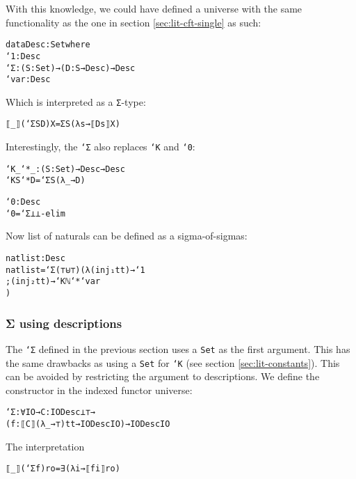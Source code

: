 With this knowledge, we could have defined a universe with the same
functionality as the one in section \ref{sec:lit-cft-single} as such:

\begin{alltt}
data Desc : Set where
  `1 : Desc
  `Σ : (S : Set) → (D : S → Desc) → Desc
  `var : Desc
\end{alltt}

Which is interpreted as a \texttt{Σ}-type:

\begin{alltt}
⟦_⟧ (`Σ S D) X = Σ S (λ s → ⟦ D s ⟧ X)
\end{alltt}

Interestingly, the \texttt{`Σ} also replaces \texttt{`K} and
\texttt{`0}:

\begin{alltt}
`K_`*_ : (S : Set) → Desc → Desc
`K S `* D = `Σ S (λ _ → D)

`0 : Desc
`0 = `Σ ⊥ ⊥-elim
\end{alltt}

\begin{example}
Now list of naturals can be defined as a sigma-of-sigmas:

\begin{alltt}
natlist : Desc
natlist = `Σ (⊤ ⊎ ⊤) (λ { (inj₁ tt) → `1
                        ; (inj₂ tt) → `K ℕ `* `var
                        })
\end{alltt}
\end{example}

\subsubsection{Σ using descriptions}

The \texttt{`Σ} defined in the previous section uses a \texttt{Set} as
the first argument.
This has the same drawbacks as using a \texttt{Set} for
\texttt{`K} (see section \ref{sec:lit-constants}).
This can be avoided by restricting the argument to descriptions.
We define the constructor in the indexed functor universe:

\begin{alltt}
`Σ : ∀{I O} → {C : IODesc ⊥ ⊤} →
     (f : ⟦ C ⟧ (λ _ → ⊤) tt → IODesc I O) → IODesc I O
\end{alltt}

The interpretation

\begin{alltt}
⟦_⟧ (`Σ f) r o = ∃ (λ i → ⟦ f i ⟧ r o)
\end{alltt}

